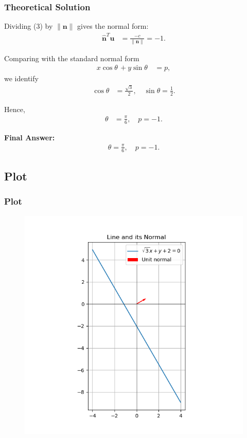 \documentclass{beamer}
\theoremstyle{remark}
\let\vec\mathbf
\numberwithin{equation}{section}
\begin{document}
\begin{frame}
\frametitle{Theoretical Solution}
Dividing (3) by $\|\vec{n}\|$ gives the normal form:
\begin{align}
\hat{\vec{n}}^T \vec{u} &= \frac{-c}{\|\vec{n}\|} = -1. \label{eq4}
\end{align}

Comparing with the standard normal form
\begin{align}
x\cos\theta\, + y\sin\theta\, &= p,
\end{align}
we identify
\begin{align}
\cos\theta &= \tfrac{\sqrt{3}}{2}, \quad 
\sin\theta = \tfrac{1}{2}. \label{eq5}
\end{align}

Hence,
\begin{align}
\theta &= \tfrac{\pi}{6}, \quad p = -1. \label{eq6}
\end{align}

\noindent \textbf{Final Answer: } 
\begin{align}
\boxed{
\theta = \tfrac{\pi}{6}, \quad p = -1.
}
\end{align}

\end{frame}







\subsection{Plot}
\begin{frame}
    \frametitle{Plot}
\begin{figure}[H]
   \centering
   \includegraphics[width=0.7\columnwidth]{figs/normalform.png}
   \caption{}
   \label{}
   \end{figure}
\end{frame}
\end{document}

